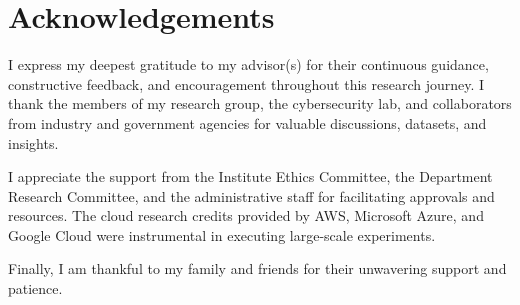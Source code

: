 \chapter*{Acknowledgements}
I express my deepest gratitude to my advisor(s) for their continuous guidance, constructive feedback, and encouragement throughout this research journey. I thank the members of my research group, the cybersecurity lab, and collaborators from industry and government agencies for valuable discussions, datasets, and insights.

I appreciate the support from the Institute Ethics Committee, the Department Research Committee, and the administrative staff for facilitating approvals and resources. The cloud research credits provided by AWS, Microsoft Azure, and Google Cloud were instrumental in executing large-scale experiments.

Finally, I am thankful to my family and friends for their unwavering support and patience.

\cleardoublepage

